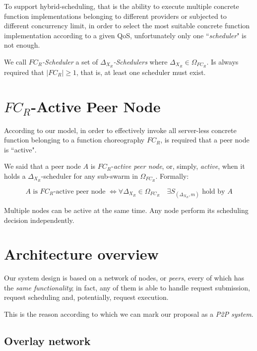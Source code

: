 \documentclass[10pt,a4paper]{article}
\theoremstyle{definition}
\begin{document}
To support hybrid-scheduling, that is the ability to execute multiple concrete function implementations belonging to different providers or subjected to different concurrency limit, in order to select the most suitable concrete function implementation according to a given QoS, unfortunately only one ``\textit{scheduler}" is not enough.

We call \textit{$FC_R$-Scheduler} a set of \textit{$\Delta_{X_{R}}$-Schedulers} where $\Delta_{X_{R}} \in \Omega_{FC_R}$. Is always required that $|FC_R| \geq 1$, that is, at least one scheduler must exist.

\section{$FC_R$-Active Peer Node}

According to our model, in order to effectively invoke all server-less concrete function belonging to a function choreography $FC_R$, is required that a peer node is ``active".

We said that a peer node $A$ is $FC_R$-\textit{active peer node}, or, simply, \textit{active}, when it holds a $\Delta_{X_{R}}$-scheduler for any sub-swarm in $\Omega_{FC_R}$. Formally:

\begin{equation}
A \text{ is } FC_R\text{-active peer node } \Leftrightarrow \forall \Delta_{X_{R}} \in \Omega_{FC_R} \quad \exists S_{(\Delta_{X_{R}},m)} \text{ hold by } A
\end{equation}

Multiple nodes can be active at the same time. Any node perform its scheduling decision independently.


\section{Architecture overview}

Our system design is based on a network of nodes, or \textit{peers}, every of which has the \textit{same functionality}; in fact, any of them is able to handle request submission, request scheduling and, potentially, request execution. 

This is the reason according to which we can mark our proposal as a \textit{P2P system}.

\subsection{Overlay network}
\end{document}
